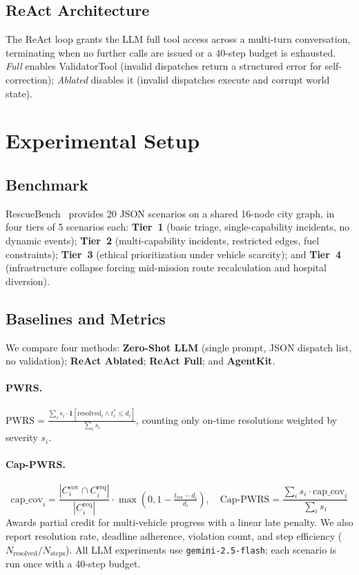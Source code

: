\documentclass{article}
\begin{document}
\subsection{ReAct Architecture}

The ReAct loop grants the LLM full tool access across a multi-turn
conversation, terminating when no further calls are issued or a 40-step
budget is exhausted. \emph{Full} enables ValidatorTool (invalid dispatches
return a structured error for self-correction); \emph{Ablated} disables it
(invalid dispatches execute and corrupt world state).

\section{Experimental Setup}
\label{sec:setup}

\subsection{Benchmark}
RescueBench~\citep{group2bench2026} provides 20 JSON scenarios on a shared
16-node city graph, in four tiers of 5 scenarios each: \textbf{Tier~1}
(basic triage, single-capability incidents, no dynamic events);
\textbf{Tier~2} (multi-capability incidents, restricted edges, fuel
constraints); \textbf{Tier~3} (ethical prioritization under vehicle
scarcity); and \textbf{Tier~4} (infrastructure collapse forcing mid-mission
route recalculation and hospital diversion).

\subsection{Baselines and Metrics}
We compare four methods: \textbf{Zero-Shot LLM} (single prompt, JSON dispatch
list, no validation); \textbf{ReAct Ablated}; \textbf{ReAct Full}; and
\textbf{AgentKit}.

\paragraph{PWRS.}
$\text{PWRS} = \frac{\sum_{i} s_i \cdot \mathbf{1}[\text{resolved}_i \wedge t_i^* \leq d_i]}
                      {\sum_{i} s_i}$,
counting only on-time resolutions weighted by severity $s_i$.

\paragraph{Cap-PWRS.}
\begin{equation}
  \text{cap\_cov}_i = \frac{|C_i^{\text{cov}} \cap C_i^{\text{req}}|}{|C_i^{\text{req}}|}
  \cdot \max\!\left(0,1-\tfrac{t_{\text{res}}-d_i}{d_i}\right),
  \quad
  \text{Cap-PWRS} = \frac{\sum_i s_i \cdot \text{cap\_cov}_i}{\sum_i s_i}
\end{equation}
Awards partial credit for multi-vehicle progress with a linear late penalty.
We also report resolution rate, deadline adherence, violation count, and step
efficiency ($N_{\text{resolved}}/N_{\text{steps}}$). All LLM experiments use
\texttt{gemini-2.5-flash}; each scenario is run once with a 40-step budget.
\end{document}
